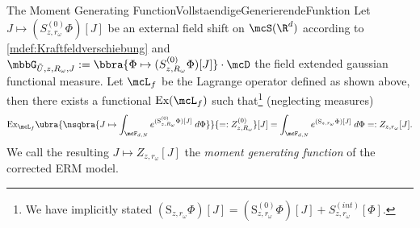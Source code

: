 \begin{mpos}{The Moment Generating Function}{VollstaendigeGenerierendeFunktion}
    Let $J\mapsto (S_{z,r_\omega}^{(0)}\Phi)[J]$ be an external field shift on $\mcS(\R^d)$ according to \ref{mdef:Kraftfeldverschiebung} and $\mbbG_{\tilde U,z,R_\omega,J}:=\bbra{\Phi\mapsto (S_{z,R_\omega}^{(0)}\Phi)[J]}\cdot\mcD$ the field extended gaussian functional measure. Let $\mcL_f$ be the Lagrange operator defined as shown above, then there exists a functional $\text{Ex}(\mcL_f)$ such that\footnote{We have implicitly stated $(\text{S}_{z,r_\omega}\Phi)[J] = (\text{S}_{z,r_\omega}^{(0)}\Phi)[J] + S_{z,r_\omega}^{(\textit{int})}[\Phi]$.} (neglecting measures)
    \[
        \text{Ex}_{\mcL_f}\ubra{\nsqbra{J\mapsto \int_{\mcF_{d,N}} e^{(\text{S}_{z,R_\omega}^{(0)}\Phi)[J]}\;d\Phi}}{=:Z_{z,R_\omega}^{(0)}}[J] = \int_{\mcF_{d,N}} e^{(\text{S}_{z,r_\omega}\Phi)[J]}\;d\Phi =: Z_{z,r_\omega}[J].
    \]
    We call the resulting $J\mapsto Z_{z,r_\omega}[J]$ the \emph{moment generating function} of the corrected ERM model.
\end{mpos}